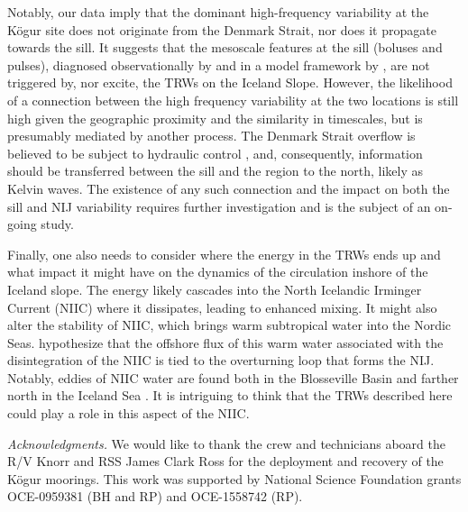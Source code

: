 \documentclass[12pt,titlepage,figuresatend]{article}
\begin{document}
Notably, our data imply that the dominant high-frequency variability at the K\"{o}gur site does not originate from the Denmark Strait, nor does it propagate towards the sill. It suggests that the mesoscale features at the sill (boluses and pulses), diagnosed observationally by \cite{Appen2017} and in a model framework by \cite{Almansi2017}, are not triggered by, nor excite, the TRWs on the Iceland Slope. However, the likelihood of a connection between the high frequency variability at the two locations is still high given the geographic proximity and the similarity in timescales, but is presumably mediated by another process. The Denmark Strait overflow is believed to be subject to hydraulic control \cite[]{Whitehead1998,Nikolopoulos2003}, and, consequently, information should be transferred between the sill and the region to the north, likely as Kelvin waves. The existence of any such connection and the impact on both the sill and NIJ variability requires further investigation and is the subject of an on-going study. 

Finally, one also needs to consider where the energy in the TRWs ends up and what impact it might have on the dynamics of the circulation inshore of the Iceland slope. The energy likely cascades into the North Icelandic Irminger Current (NIIC) where it dissipates, leading to enhanced mixing. It might also alter the stability of NIIC, which brings warm subtropical water into the Nordic Seas. \citet[]{Vage2011} hypothesize that the offshore flux of this warm water associated with the disintegration of the NIIC is tied to the overturning loop that forms the NIJ. Notably, eddies of NIIC water are found both in the Blosseville Basin \cite[]{Jonsson2012} and farther north in the Iceland Sea \cite[]{Vage2011}. It is intriguing to think that the TRWs described here could play a role in this aspect of the NIIC. 


\bigskip
\emph{Acknowledgments.}
We would like to thank the crew and technicians aboard the R/V Knorr and RSS James Clark Ross for the deployment and recovery of the K\"{o}gur moorings. This work was supported by National Science Foundation grants OCE-0959381 (BH and RP) and OCE-1558742 (RP).




\end{document}
